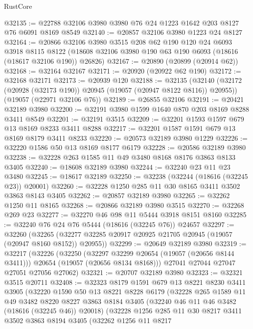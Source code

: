 \begin{lexlean}{RustCore}
\begin{coremodule}
@32135 := @22788 @32106 @3980 @3980 @76 @24 @1223 @1642 @203 @8127 @76 @6091 @8169 @8549
@32140 := @20857 @32106 @3980 @1223 @24 @8127
@32164 := @20866
    @32106
    @3980
    @3515
    @208
    @62
    @190
    @120
    @24
    @6093
    @3918
    @8115
    @8122
    (@18608 @32106 @3980 @190 @63 @190 @6093 (@18616 (@18617 @32106 @190)) @26826)
@32167 := @20890 (@20899 (@20914 @62))
@32168 := @32164 @32167
@32171 := @20920 (@20922 @62 @190)
@32172 := @32168 @32171
@32173 := @20939 @120
@32188 := @32135
    (@32140 (@32172 (@20928 (@32173 @190)) @20945 (@19057 (@20947 @8122 @8116)) @20955))
    (@19057 (@22971 @32106 @76))
@32189 := @26855 @32106
@32191 := @20421 @32189 @3980
@32200 := @32191 @3980 @1599 @1640 @870 @203 @8169 @8288 @3411 @8549
@32201 := @32191 @3515
@32209 := @32201 @1593 @1597 @679 @13 @8169 @8233 @3411 @8288
@32217 := @32201 @1587 @1591 @679 @13 @8169 @8179 @3411 @8233
@32220 := @20573 @32189 @3980 @1229
@32226 := @32220 @1586 @50 @13 @8169 @8177 @6179
@32228 := @20586 @32189 @3980
@32238 := @32228 @263 @1585 @11 @49 @3480 @8168 @8176 @3863 @8133 @3405
@32240 := @18608 @32189 @3980
@32244 := @32240 @23 @11 @23 @3480
@32245 := @18617 @32189
@32250 := @32238 (@32244 (@18616 (@32245 @23)) @20001)
@32260 := @32228 @1250 @285 @11 @30 @8165 @3411 @3502 @3863 @8143 @3405
@32262 := @20857 @32189 @3980
@32265 := @32262 @1250 @11 @8165
@32268 := @20866 @32189 @3980 @3515
@32270 := @32268 @269 @23
@32277 := @32270 @46 @98 @11 @5444 @3918 @8151 @8160
@32285 := @32240 @76 @24 @76 @5444 (@18616 (@32245 @76)) @24657
@32297 := @32260
    (@32265 (@32277 @32285 @20917 @20925 @21705 @20945 (@19057 (@20947 @8160 @8152)) @20955))
@32299 := @20649 @32189 @3980
@32319 := @32217
    (@32226
      (@32250
        (@32297 @32299 @20654 (@19057 (@20656 @8144 @3411)))
        @20654
        (@19057 (@20656 @8134 @8168)))
      @27041
      @27044
      @27047
      @27051
      @27056
      @27062)
@32321 := @20707 @32189 @3980
@32323 := @32321 @3515 @20711
@32408 := @32323
    @8179
    @1591
    @679
    @13
    @8221
    @8230
    @3411
    @3905
    (@32220
      @1590
      @50
      @13
      @8221
      @8228
      @6179
      (@32228
        @265
        @1589
        @11
        @49
        @3482
        @8220
        @8227
        @3863
        @8184
        @3405
        (@32240 @46 @11 @46 @3482 (@18616 (@32245 @46)) @20018)
        (@32228
          @1256
          @285
          @11
          @30
          @8217
          @3411
          @3502
          @3863
          @8194
          @3405
          (@32262
            @1256
            @11
            @8217

\end{coremodule}
\end{lexlean}
